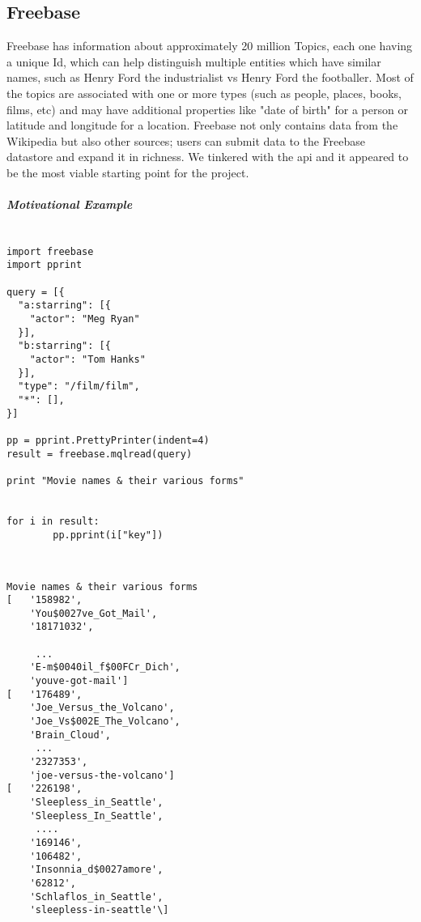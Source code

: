 \documentclass[11pt]{article}
\begin{document}
\subsection{Freebase} 
Freebase has information about approximately 20 million Topics, each one having a
unique Id, which can help distinguish multiple entities which have similar names,
such as Henry Ford the industrialist vs Henry Ford the footballer. Most of the
topics are associated with one or more types\cite{freebasetype} (such as
people, places, books, films, etc) and may have additional properties like "date of birth" for a person
or latitude and longitude for a location. Freebase not only contains data from
the Wikipedia but also other sources; users can submit data to the Freebase
datastore and expand it in richness. We tinkered with the api\cite{freebaseapi}
and it appeared to be the most viable starting point for the project.

\subparagraph{Motivational Example}

\begin{lstlisting}[label=some-code,caption=Minimal code to Freebase]

import freebase
import pprint

query = [{
  "a:starring": [{
    "actor": "Meg Ryan"                                                       
  }],
  "b:starring": [{                                                            
    "actor": "Tom Hanks"
  }],
  "type": "/film/film",
  "*": [],
}]  
    
pp = pprint.PrettyPrinter(indent=4)
result = freebase.mqlread(query)
    
print "Movie names & their various forms"
    
    
for i in result:                                                              
        pp.pprint(i["key"])                                                   
                
\end{lstlisting}
\begin{lstlisting}[label=output,caption=Cleaned Output]

Movie names & their various forms
[   '158982',
    'You$0027ve_Got_Mail',
    '18171032',

     ...
    'E-m$0040il_f$00FCr_Dich',
    'youve-got-mail']
[   '176489',
    'Joe_Versus_the_Volcano',
    'Joe_Vs$002E_The_Volcano',
    'Brain_Cloud',
     ...
    '2327353',
    'joe-versus-the-volcano']
[   '226198',
    'Sleepless_in_Seattle',
    'Sleepless_In_Seattle',
     ....
    '169146',
    '106482',
    'Insonnia_d$0027amore',
    '62812',
    'Schlaflos_in_Seattle',
    'sleepless-in-seattle'\]

\end{lstlisting}
\end{document}
